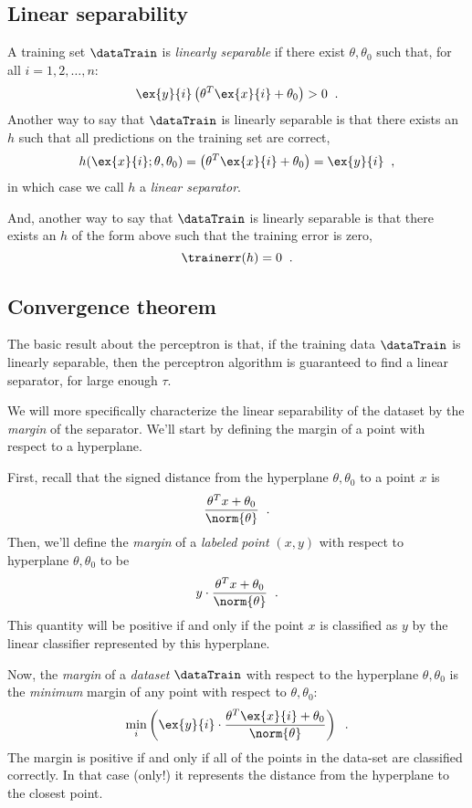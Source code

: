 \subsection{Linear separability}
A training set $\dataTrain$ is {\em{linearly separable}} if there exist
$\theta, \theta_0$ such that, for all $i = 1, 2, \dots, n$:
$$ \ex{y}{i}\left(\theta^T\ex{x}{i} + \theta_0\right) > 0 \;\;.$$
Another way to say that $\dataTrain$ is linearly separable
is that there exists an $h$ such that all predictions on the training set
are correct,
$$ h(\ex{x}{i}; \theta, \theta_0) = \left(\theta^T\ex{x}{i} + \theta_0\right) =
  \ex{y}{i} \;\;,$$
in which case we call $h$ a {\em linear separator}.

And, another way to say that $\dataTrain$ is linearly separable
is that there exists an $h$ of the form above such that
the training error is zero,
$$\trainerr(h) = 0 \;\;.$$

\subsection{Convergence theorem}
The basic result about the perceptron is that, if the training data
$\dataTrain$ is linearly separable, then the perceptron algorithm is
guaranteed to find a linear separator, for large
enough $\tau.$ 

We will more specifically characterize the linear separability of the
dataset by the \emph{margin} of the separator.   We'll start by
defining the margin of a point with respect to a hyperplane.

First, recall that the signed distance from the
hyperplane $\theta, \theta_0$ to a point $x$ is
\[ \frac{\theta^Tx + \theta_0}{\norm{\theta}}\;\;. \]
Then, we'll define the {\em margin} of a {\em labeled point} $(x, y)$
with respect to hyperplane $\theta, \theta_0$ to be
\[ y \cdot \frac{\theta^Tx + \theta_0}{\norm{\theta}}\;\;. \]
This quantity will be positive if and only if the point $x$ is
classified as $y$ by the linear classifier represented by this
hyperplane.

Now, the {\em margin} of a {\em dataset} $\dataTrain$ with respect to the hyperplane
$\theta, \theta_0$ is the {\em minimum} margin of any point with respect
to $\theta, \theta_0$:
\[\min_i \left(\ex{y}{i} \cdot \frac{\theta^T \ex{x}{i} + \theta_0}{\norm{\theta}}\right)\;\;.\]
The margin is positive if and only if all of the points in the data-set
are classified correctly.  In that case (only!) it represents the
distance from the hyperplane to the closest point.

